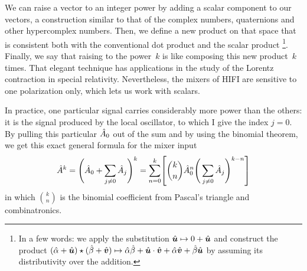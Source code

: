 We can raise a vector to an integer power by adding a scalar component to our vectors,
a construction similar to that of the complex numbers, quaternions \parencite{hamilton1866elements} and other hypercomplex numbers.
Then, we define a new product on that space that is consistent both with the conventional dot product and the scalar product%
\footnote{
   In a few words:
   we apply the substitution $\hat{\bm{u}} \mapsto 0 + \hat{\bm{u}}$
   and construct the product
   $(\hat{\alpha} + \hat{\bm{u}}) \star (\hat{\beta} + \hat{\bm{v}})
   \mapsto
   \hat{\alpha}\hat{\beta} + \hat{\bm{u}} \cdot \hat{\bm{v}}
   +
   \hat{\alpha} \hat{\bm{v}} + \hat{\beta} \hat{\bm{u}}
   $
   by assuming its distributivity over the addition.
}.
Finally, we say that raising to the power~$k$ is like composing this new product~$k$ times.
That elegant technique has applications in the study of the Lorentz contraction in special relativity.
Nevertheless, the mixers of HIFI are sensitive to one polarization only, which lets us work with scalars.

In practice, one particular signal carries considerably more power than the others: it is the signal produced by the local oscillator, to which I give the index $j=0$.
By pulling this particular $\hat{A}_0$ out of the sum and by using the binomial theorem, we get this exact general formula for the mixer input
\[
    \cp{A}^k
    =
    \Bigg(
        \cp{A}_0
        +
        \sum_{j \ne 0}
        \cp{A}_j
    \Bigg)^k
    =
    \sum_{n=0}^{k}
    \left[
    \binom{k}{n} 
    \cp{A}_0^n 
    \Bigg(
        \sum_{j \ne 0}
        \cp{A}_j
    \Bigg)^{k-n}
    \right]
\]
in which $\binom{k}{n}$ is the binomial coefficient from Pascal's triangle and combinatronics.

